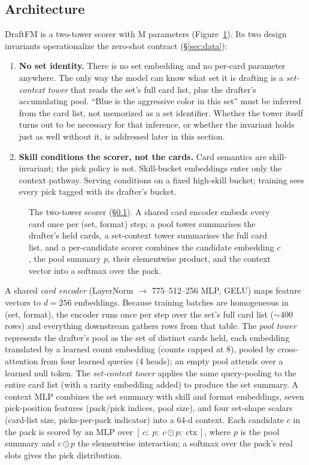 \subsection{Architecture}
\label{sec:arch}

DraftFM is a two-tower scorer with \FdevParams M parameters (Figure~\ref{fig:arch}). Its two design
invariants operationalize the zero-shot contract (\S\ref{sec:data}):

\begin{enumerate}
  \item \textbf{No set identity.} There is no set embedding and no
  per-card parameter anywhere. The only way the model can know what set it
  is drafting is a \emph{set-context tower} that reads the set's full card
  list, plus the drafter's accumulating pool. ``Blue is the aggressive
  color in this set'' must be inferred from the card list, not memorized
  as a set identifier. Whether the tower itself turns out to be necessary
  for that inference, or whether the invariant holds just as well without
  it, is addressed later in this section.
  \item \textbf{Skill conditions the scorer, not the cards.} Card
  semantics are skill-invariant; the pick policy is not. Skill-bucket
  embeddings enter only the context pathway. Serving conditions on a fixed
  high-skill bucket; training sees every pick tagged with its drafter's
  bucket.
\end{enumerate}

\begin{figure}[t]
\centering

\caption{The two-tower scorer (\S\ref{sec:arch}). A shared card encoder
embeds every card once per (set, format) step; a pool tower summarises
the drafter's held cards, a set-context tower summarises the full card
list, and a per-candidate scorer combines the candidate embedding
$c$, the pool summary $p$, their elementwise product, and the context
vector into a softmax over the pack.}
\label{fig:arch}
\end{figure}

A shared \emph{card encoder} (LayerNorm $\to$ 775--512--256 MLP, GELU)
maps feature vectors to $d{=}256$ embeddings. Because training batches are
homogeneous in (set, format), the encoder runs once per step over the
set's full card list ($\sim$400 rows) and everything downstream gathers
rows from that table. The \emph{pool tower} represents the drafter's pool
as the set of distinct cards held, each embedding translated by a learned
count embedding (counts capped at 8), pooled by cross-attention from four
learned queries (4 heads); an empty pool attends over a learned null token.
The \emph{set-context tower} applies the same query-pooling to the entire
card list (with a rarity embedding added) to produce the set summary. A
context MLP combines the set summary with skill and format embeddings,
seven pick-position features (pack/pick indices, pool size), and four
set-shape scalars (card-list size, picks-per-pack indicator) into a 64-d
context. Each candidate $c$ in the pack is scored by an MLP over
$[\,c;\; p;\; c \odot p;\; \mathrm{ctx}\,]$, where $p$ is the pool summary
and $c \odot p$ the elementwise interaction; a softmax over the pack's
real slots gives the pick distribution.

